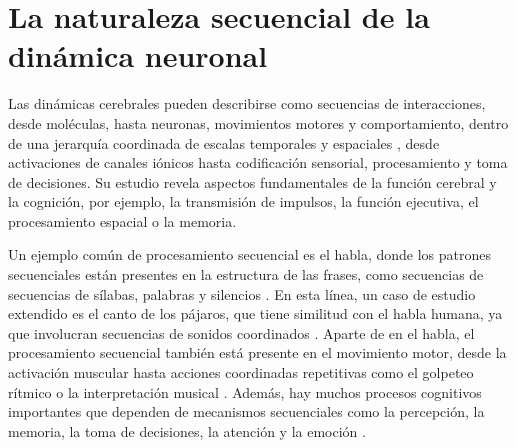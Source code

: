 \section{La naturaleza secuencial de la dinámica neuronal}

Las dinámicas cerebrales pueden describirse como secuencias de interacciones, desde moléculas, hasta neuronas, movimientos motores y comportamiento, dentro de una jerarquía coordinada de escalas temporales y espaciales \parencite{kiebel_hierarchy_2008,yuste_cortex_2005,rabinovich_discrete_2018,rabinovich_neurons_2023}, desde activaciones de canales iónicos hasta codificación sensorial, procesamiento y toma de decisiones. Su estudio revela aspectos fundamentales de la función cerebral y la cognición, por ejemplo, la transmisión de impulsos, la función ejecutiva, el procesamiento espacial o la memoria.

Un ejemplo común de procesamiento secuencial es el habla, donde los patrones secuenciales están presentes en la estructura de las frases, como secuencias de secuencias de sílabas, palabras y silencios \parencite{kiebel_recognizing_2009}. En esta línea, un caso de estudio extendido es el canto de los pájaros, que tiene similitud con el habla humana, ya que involucran secuencias de sonidos coordinados \parencite{prather_brains_2017,fishbein_sound_2019}. Aparte de en el habla, el procesamiento secuencial también está presente en el movimiento motor, desde la activación muscular hasta acciones coordinadas repetitivas como el golpeteo rítmico o la interpretación musical \parencite{ding_temporal_2017}. Además, hay muchos procesos cognitivos importantes que dependen de mecanismos secuenciales como la percepción, la memoria, la toma de decisiones, la atención y la emoción \parencite{varona_hierarchical_2016, he_robust_2018, rabinovich_sequential_2020}.

